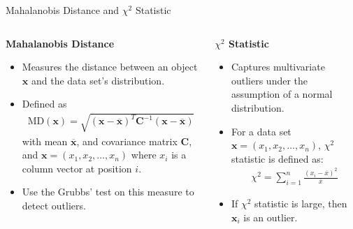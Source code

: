 \begin{frame}{Mahalanobis Distance and $\chi^2$ Statistic}
	\vspace*{-2em}
	\begin{columns}[t]
		\begin{column}{0.5\textwidth}
			\begin{center}
				\textbf{Mahalanobis Distance}
			\end{center}
			\vspace*{-1em}
			\begin{itemize}
				\item Measures the distance between an object $\mathbf{x}$ and the data set's distribution.
				\item Defined as
				      \begin{align*}
					      \text{MD}(\mathbf{x}) = \sqrt{(\mathbf{x} - \mathbf{\overline{x}})^T \mathbf{C}^{-1} (\mathbf{x} - \mathbf{\overline{x}})}
				      \end{align*}
				      with mean $\mathbf{\overline{x}}$, and covariance matrix $\mathbf{C}$, and $\mathbf{x}=(x_1, x_2, \dots, x_n)$ where $x_i$ is a column vector at position $i$.
				\item Use the Grubbs' test on this measure to detect outliers.
			\end{itemize}
		\end{column}

		\begin{column}{0.5\textwidth}
			\begin{center}
				\textbf{$\chi^2$ Statistic}
			\end{center}
			\vspace*{-1em}
			\begin{itemize}
				\item Captures multivariate outliers under the assumption of a normal distribution.
				\item For a data set $\mathbf{x}=(x_1, x_2, \dots, x_n)$, $\chi^2$ statistic is defined as:
				      \begin{align*}
					      \chi^2 = \sum_{i=1}^n \frac{(x_i - \overline{x})^2}{\overline{x}}
				      \end{align*}
				\item If $\chi^2$ statistic is large, then $\mathbf{x}_i$ is an outlier.
			\end{itemize}
		\end{column}
	\end{columns}
\end{frame}

